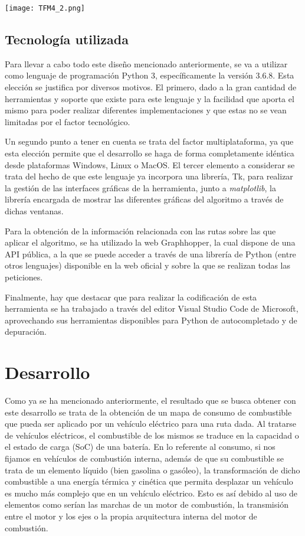 \documentclass[11pt,spanish,listoffigures,listoftables]{tfgetsinf}
\begin{document}
\begin{center}
\texttt{[image: TFM4\_2.png]}    
\end{center}

\section{Tecnología utilizada}
Para llevar a cabo todo este diseño mencionado anteriormente, se va a utilizar como lenguaje de programación Python 3, específicamente la versión 3.6.8. Esta elección se justifica por diversos motivos. El primero, dado a la gran cantidad de herramientas y soporte que existe para este lenguaje y la facilidad que aporta el mismo para poder realizar diferentes implementaciones y que estas no se vean limitadas por el factor tecnológico.

Un segundo punto a tener en cuenta se trata del factor multiplataforma, ya que esta elección permite que el desarrollo se haga de forma completamente idéntica desde plataformas Windows, Linux o MacOS. El tercer elemento a considerar se trata del hecho de que este lenguaje ya incorpora una librería, Tk, para realizar la gestión de las interfaces gráficas de la herramienta, junto a \textit{matplotlib}, la librería encargada de mostrar las diferentes gráficas del algoritmo a través de dichas ventanas.

Para la obtención de la información relacionada con las rutas sobre las que aplicar el algoritmo, se ha utilizado la web Graphhopper, la cual dispone de una API pública, a la que se puede acceder a través de una librería de Python (entre otros lenguajes) disponible en la web oficial y sobre la que se realizan todas las peticiones. 

Finalmente, hay que destacar que para realizar la codificación de esta herramienta se ha trabajado a través del editor Visual Studio Code de Microsoft, aprovechando sus herramientas disponibles para Python de autocompletado y de depuración.


\chapter{Desarrollo}
Como ya se ha mencionado anteriormente, el resultado que se busca obtener con este desarrollo se trata de la obtención de un mapa de consumo de combustible que pueda ser aplicado por un vehículo eléctrico para una ruta dada. Al tratarse de vehículos eléctricos, el combustible de los mismos se traduce en la capacidad o el estado de carga (SoC) de una batería. En lo referente al consumo, si nos fijamos en vehículos de combustión interna, además de que su combustible se trata de un elemento líquido (bien gasolina o gasóleo), la transformación de dicho combustible a una energía térmica y cinética que permita desplazar un vehículo es mucho más complejo que en un vehículo eléctrico. Esto es así debido al uso de elementos como serían las marchas de un motor de combustión, la transmisión entre el motor y los ejes o la propia arquitectura interna del motor de combustión.
\end{document}
